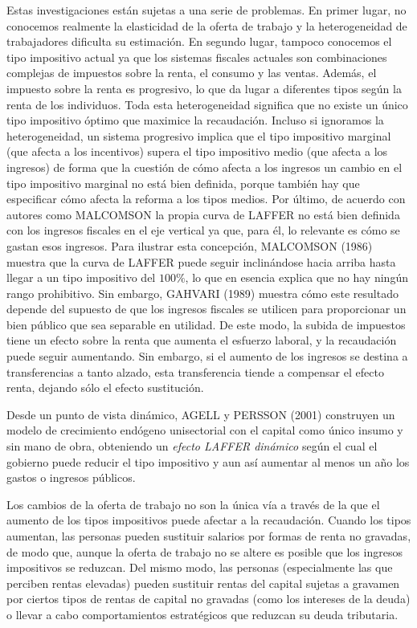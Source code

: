 \documentclass[10pt,a4paper]{article}
\begin{document}
Estas investigaciones están sujetas a una serie de problemas. En primer lugar, no conocemos realmente la elasticidad de la oferta de trabajo y la heterogeneidad de trabajadores dificulta su estimación. En segundo lugar, tampoco conocemos el tipo impositivo actual ya que los sistemas fiscales actuales son combinaciones complejas de impuestos sobre la renta, el consumo y las ventas. Además, el impuesto sobre la renta es progresivo, lo que da lugar a diferentes tipos según la renta de los individuos. Toda esta heterogeneidad significa que no existe un único tipo impositivo óptimo que maximice la recaudación. Incluso si ignoramos la heterogeneidad, un sistema progresivo implica que el tipo impositivo marginal (que afecta a los incentivos) supera el  tipo impositivo medio (que afecta a los ingresos) de forma que la cuestión de cómo afecta a los ingresos un cambio en el tipo impositivo marginal no está bien definida, porque también hay que especificar cómo afecta la reforma a los tipos medios. Por último, de acuerdo con autores como MALCOMSON la propia curva de LAFFER no está bien definida con los ingresos fiscales en el eje vertical ya que, para él, lo relevante es cómo se gastan esos ingresos. Para ilustrar esta concepción, MALCOMSON (1986) muestra que la curva de LAFFER puede seguir inclinándose hacia arriba hasta llegar a un tipo impositivo del $100\%$, lo que en esencia explica que no hay ningún rango prohibitivo. Sin embargo, GAHVARI (1989) muestra cómo este resultado depende del supuesto de que los ingresos fiscales se utilicen para proporcionar un bien público que sea separable en utilidad. De este modo, la subida de impuestos tiene un efecto sobre la renta que aumenta el esfuerzo laboral, y la recaudación puede seguir aumentando. Sin embargo, si el aumento de los ingresos se destina a transferencias a tanto alzado, esta transferencia tiende a compensar el efecto renta, dejando sólo el efecto sustitución. 

Desde un punto de vista dinámico, AGELL y PERSSON (2001) construyen un modelo de crecimiento endógeno unisectorial con el capital como único insumo y sin mano de obra, obteniendo un \textit{efecto LAFFER dinámico} según el cual el gobierno puede reducir el tipo impositivo y aun así aumentar al menos un año los gastos o ingresos públicos.

Los cambios de la oferta de trabajo no son la única vía a través de la que el aumento de los tipos impositivos puede afectar a la recaudación. Cuando los tipos aumentan, las personas pueden sustituir salarios por formas de renta no gravadas, de modo que, aunque la oferta de trabajo no se altere es posible que los ingresos impositivos se reduzcan. Del mismo modo, las personas (especialmente las que perciben rentas elevadas) pueden sustituir rentas del capital sujetas a gravamen por ciertos tipos de rentas de capital no gravadas (como los intereses de la deuda) o llevar a cabo comportamientos estratégicos que reduzcan su deuda tributaria. 
\end{document}
